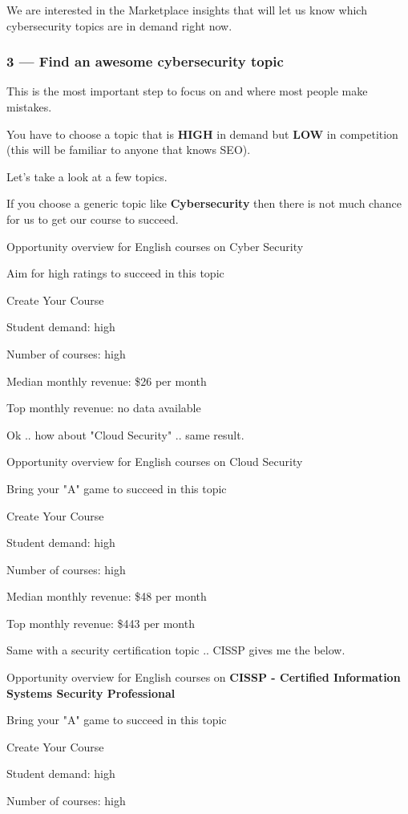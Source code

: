 \documentclass[11pt]{article}
\begin{document}
We are interested in the Marketplace insights that will let us know which cybersecurity topics are in demand right now.

\subsubsection*{3 — Find an awesome cybersecurity topic}
This is the most important step to focus on and where most people make mistakes.

You have to choose a topic that is \textbf{HIGH} in demand but \textbf{LOW} in competition (this will be familiar to anyone that knows SEO).

Let's take a look at a few topics.

If you choose a generic topic like \textbf{Cybersecurity} then there is not much chance for us to get our course to succeed.

Opportunity overview for English courses on Cyber Security

Aim for high ratings to succeed in this topic

Create Your Course

Student demand: high

Number of courses: high

Median monthly revenue: \$26 per month

Top monthly revenue: no data available

Ok .. how about "Cloud Security" .. same result.

Opportunity overview for English courses on Cloud Security

Bring your "A" game to succeed in this topic

Create Your Course

Student demand: high

Number of courses: high

Median monthly revenue: \$48 per month

Top monthly revenue: \$443 per month

Same with a security certification topic .. CISSP gives me the below.

Opportunity overview for English courses on \textbf{CISSP - Certified Information Systems Security Professional}

Bring your "A" game to succeed in this topic

Create Your Course

Student demand: high

Number of courses: high
\end{document}
